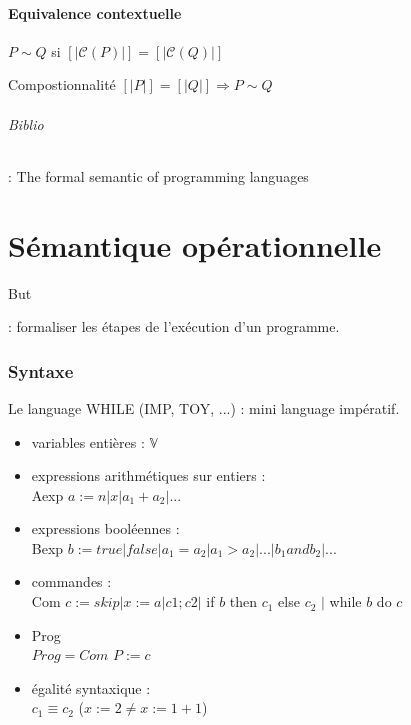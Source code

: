 \documentclass[10pt,a4paper]{article}
\newcommand{\semm}[1]{\left[| #1 | \right]}
\begin{document}
\subsection{Equivalence contextuelle}
$P \sim Q$ si $\semm{\mathcal{C}(P)} = \semm{\mathcal{C}(Q)}$
\begin{propriete}{Compostionnalité}
$\semm P = \semm Q  \Rightarrow P \sim Q$
\end{propriete}
\paragraph{Biblio} :
The formal semantic of programming languages

\part{Sémantique opérationnelle}

\subparagraph{But} : formaliser les étapes de l'exécution d'un programme.

\section{Syntaxe}
Le language WHILE (IMP, TOY, ...) : mini language impératif.
\begin{itemize}
\item variables entières : $\mathbb{V}$
\item expressions arithmétiques sur entiers : \\
Aexp $ a := n \vert x \vert a_1 + a_2 \vert ...$
\item expressions booléennes : \\
Bexp $ b := true | false | a_1 = a_2 | a_1 > a_2 | ... | b_1 and b_2 | ...$
\item commandes : \\
Com $c := skip \vert x := a | c1; c2 |$ if $b$ then $c_1$ else $c_2$ $|$ while $b$ do $c$
\item Prog \\
$Prog = Com$ $P := c$
\item égalité syntaxique : \\
$c_1 \equiv c_2$ ($x := 2 \neq x := 1 + 1$)
\end{itemize}
\end{document}
